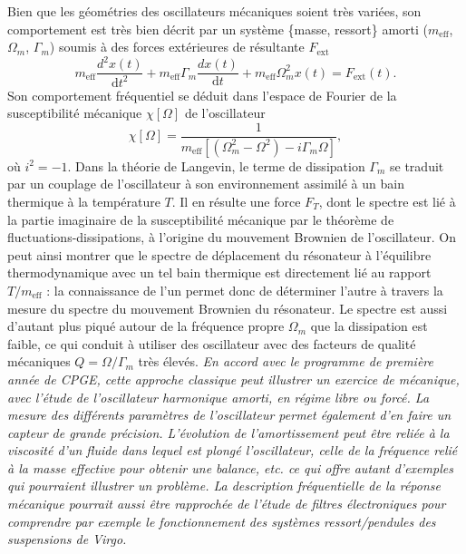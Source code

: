 \documentclass[12pt,a4paper]{article}
\renewcommand{\d}{\mathrm{d}}
\begin{document}
Bien que les géométries des oscillateurs mécaniques soient très variées, son comportement est très bien décrit par un système \{masse, ressort\} amorti ($m_\mathrm{eff}$, $\Omega_m$, $\Gamma_m$) soumis à des forces extérieures de résultante $F_\mathrm{ext}$
\begin{equation}
m_\mathrm{eff} \frac{d^2 x(t)}{\d t^2} + m_\mathrm{eff}\Gamma_m \frac{d x(t)}{\d t} + m_\mathrm{eff} \Omega_m^2 x(t) = F_\mathrm{ext}(t).
\end{equation}
Son comportement fréquentiel se déduit dans l'espace de Fourier de la susceptibilité mécanique $\chi[\Omega]$ de l'oscillateur 
\begin{equation}
\chi[\Omega] = \frac{1}{m_\mathrm{eff}[(\Omega_m^2-\Omega^2)-i\Gamma_m\Omega]},
\end{equation}
où $i^2=-1$. 
Dans la théorie de Langevin, le terme de dissipation $\Gamma_m$ se traduit par un couplage de l'oscillateur à son environnement assimilé à un bain thermique à la température $T$.
Il en résulte une force $F_T$, dont le spectre est lié à la partie imaginaire de la susceptibilité mécanique par le théorème de fluctuations-dissipations, à l'origine du mouvement Brownien de l'oscillateur.
On peut ainsi montrer que le spectre de déplacement du résonateur à l'équilibre thermodynamique avec un tel bain thermique est directement lié au rapport $T/m_\mathrm{eff}$ : la connaissance de l'un permet donc de déterminer l'autre à travers la mesure du spectre du mouvement Brownien du résonateur.
Le spectre est aussi d'autant plus piqué autour de la fréquence propre $\Omega_m$ que la dissipation est faible, ce qui conduit à utiliser des oscillateur avec des facteurs de qualité mécaniques $Q=\Omega/\Gamma_m$ très élevés.
\emph{En accord avec le programme de première année de CPGE, cette approche classique peut illustrer un exercice de mécanique, avec l'étude de l'oscillateur harmonique amorti, en régime libre ou forcé.
La mesure des différents paramètres de l'oscillateur permet également d'en faire un capteur de grande précision.
L'évolution de l'amortissement peut être reliée à la viscosité d'un fluide dans lequel est plongé l'oscillateur, celle de la fréquence relié à la masse effective pour obtenir une balance, etc. ce qui offre autant d'exemples qui pourraient illustrer un problème.
La description fréquentielle de la réponse mécanique pourrait aussi être rapprochée de l'étude de filtres électroniques pour comprendre par exemple le fonctionnement des systèmes ressort/pendules des suspensions de Virgo.}
\end{document}
